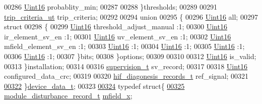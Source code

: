 \begin{DoxyCode}
00286         \hyperlink{a00001_aae7407b021d43f7193a81a58cfb3e297}{Uint16}                              probablity\_min;
00287 
00288         \}thresholds;
00289 
00291         \hyperlink{a00003_de/d14/a00139}{trip\_criteria\_ut}                    trip\_criteria;
00292 
00294         \textcolor{keyword}{union}
00295         \{
00296            \hyperlink{a00001_aae7407b021d43f7193a81a58cfb3e297}{Uint16}                           all;
00297            \textcolor{keyword}{struct}
00298            \{
00299               \hyperlink{a00001_aae7407b021d43f7193a81a58cfb3e297}{Uint16}                        threshold\_adjust\_manual :1;
00300               \hyperlink{a00001_aae7407b021d43f7193a81a58cfb3e297}{Uint16}                        ir\_element\_sv\_en        :1;
00301               \hyperlink{a00001_aae7407b021d43f7193a81a58cfb3e297}{Uint16}                        uv\_element\_sv\_en        :1;
00302               \hyperlink{a00001_aae7407b021d43f7193a81a58cfb3e297}{Uint16}                        mfield\_element\_sv\_en    :1;
00303               \hyperlink{a00001_aae7407b021d43f7193a81a58cfb3e297}{Uint16}                                                :1;
00304               \hyperlink{a00001_aae7407b021d43f7193a81a58cfb3e297}{Uint16}                                                :1;
00305               \hyperlink{a00001_aae7407b021d43f7193a81a58cfb3e297}{Uint16}                                                :1;
00306               \hyperlink{a00001_aae7407b021d43f7193a81a58cfb3e297}{Uint16}                                                :1;
00307            \}bits;
00308         \}options;
00309 
00310 
00312         \hyperlink{a00001_aae7407b021d43f7193a81a58cfb3e297}{Uint16}                             is\_valid;
00313    \}installation;
00314 
00316     \hyperlink{a00003_d5/d5b/a00135}{supervision\_t}                          sv\_record;
00317 
00318     \hyperlink{a00001_aae7407b021d43f7193a81a58cfb3e297}{Uint16}                                 configured\_data\_crc;
00319 
00320     \hyperlink{a00003_a4726b814166e222a6f13e21453f76d8d}{hif\_diagonesis\_records\_t}               ref\_signal;
00321 
\hypertarget{a00003_source_l00322}{}\hyperlink{a00003_a95029dff9c90f6a6907353ba86eb3f33}{00322} \}\hyperlink{a00003_a95029dff9c90f6a6907353ba86eb3f33}{device\_data\_t};
00323 
\hypertarget{a00003_source_l00324}{}\hyperlink{a00003}{00324}  \textcolor{keyword}{typedef} \textcolor{keyword}{struct}\{
\hypertarget{a00003_source_l00325}{}\hyperlink{a00003_a241d2538d580d57649cce4000fc4c743}{00325}     \hyperlink{a00008}{module\_disturbance\_record\_t}            \hyperlink{a00003_a241d2538d580d57649cce4000fc4c743}{mfield\_x};

\end{DoxyCode}
